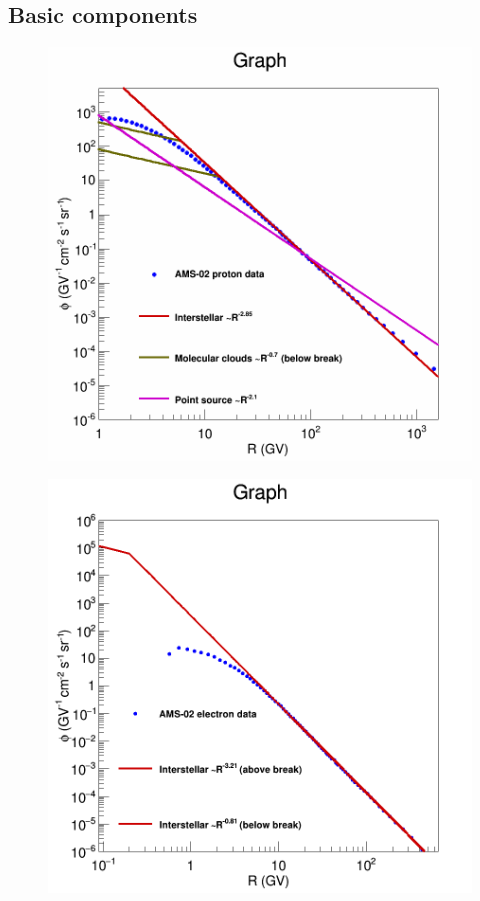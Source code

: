 \subsection{Basic components}

\begin{figure}[h]
  \centering
  \begin{minipage}[h]{0.45\textwidth}
  	\centering
	\includegraphics[width=1.\linewidth]{pic/method/CR_protons_spectra.png}
  	\subcaption{}
 	\label{fig:proton_spec}
  \end{minipage}
  \hfill
  \begin{minipage}[h]{0.45\textwidth}
	  \centering
	  \includegraphics[width=1.\linewidth]{pic/method/CR_electrons.png}

\end{minipage}
\end{figure}
